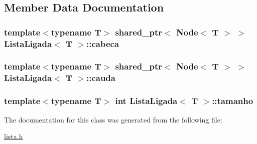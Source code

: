 \subsection{Member Data Documentation}
\hypertarget{classListaLigada_a248027a0a05a7221fa718366db452fea}{
\subsubsection[{cabeca}]{\setlength{\rightskip}{0pt plus 5cm}template$<$typename T$>$ shared\-\_\-ptr$<$ {\bf Node}$<$ T $>$ $>$ {\bf Lista\-Ligada}$<$ T $>$\-::cabeca\hspace{0.3cm}{\ttfamily [protected]}}}\label{classListaLigada_a248027a0a05a7221fa718366db452fea}
\hypertarget{classListaLigada_afb8bf9675df9229a9b03e41fe584fafa}{
\subsubsection[{cauda}]{\setlength{\rightskip}{0pt plus 5cm}template$<$typename T$>$ shared\-\_\-ptr$<$ {\bf Node}$<$ T $>$ $>$ {\bf Lista\-Ligada}$<$ T $>$\-::cauda\hspace{0.3cm}{\ttfamily [protected]}}}\label{classListaLigada_afb8bf9675df9229a9b03e41fe584fafa}
\hypertarget{classListaLigada_a7cb56d42e0603821e0b8f8645ec55ba0}{
\subsubsection[{tamanho}]{\setlength{\rightskip}{0pt plus 5cm}template$<$typename T$>$ int {\bf Lista\-Ligada}$<$ T $>$\-::tamanho\hspace{0.3cm}{\ttfamily [protected]}}}\label{classListaLigada_a7cb56d42e0603821e0b8f8645ec55ba0}


The documentation for this class was generated from the following file\-:\begin{DoxyCompactItemize}
\item 
\hyperlink{lista_8h}{lista.\-h}\end{DoxyCompactItemize}
